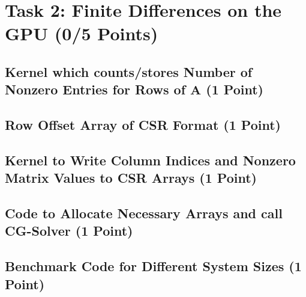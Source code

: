 \section{Task 2: Finite Differences on the GPU (0/5 Points)}

\subsection{Kernel which counts/stores Number of Nonzero Entries for Rows of $\mathbf{A}$ (1 Point)}

\pagebreak
\subsection{Row Offset Array of CSR Format (1 Point)}


\pagebreak
\subsection{Kernel to Write Column Indices and Nonzero Matrix Values to CSR Arrays (1 Point)}


\pagebreak
\subsection{Code to Allocate Necessary Arrays and call CG-Solver (1 Point)}


\pagebreak
\subsection{Benchmark Code for Different System Sizes (1 Point)}